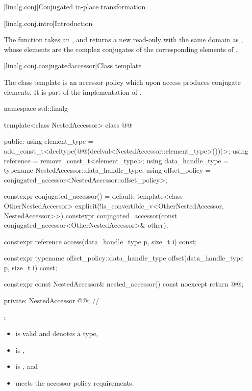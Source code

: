[linalg.conj]{Conjugated in-place transformation}

[linalg.conj.intro]{Introduction}

\pnum
The  function takes an  ,
and returns a new read-only  
with the same domain as ,
whose elements are the complex conjugates
of the corresponding elements of .

[linalg.conj.conjugatedaccessor]{Class template }

\pnum
The class template 
is an  accessor policy
which upon access produces conjugate elements.
It is part of the implementation of
.

\begin{codeblock}
namespace std::linalg {
  template<class NestedAccessor>
  class @@ {
  public:
    using element_type =
      add_const_t<decltype(@@(declval<NestedAccessor::element_type>()))>;
    using reference = remove_const_t<element_type>;
    using data_handle_type = typename NestedAccessor::data_handle_type;
    using offset_policy = conjugated_accessor<NestedAccessor::offset_policy>;

    constexpr conjugated_accessor() = default;
    template<class OtherNestedAccessor>
      explicit(!is_convertible_v<OtherNestedAccessor, NestedAccessor>>)
      constexpr conjugated_accessor(const conjugated_accessor<OtherNestedAccessor>& other);

    constexpr reference access(data_handle_type p, size_t i) const;

    constexpr typename offset_policy::data_handle_type
      offset(data_handle_type p, size_t i) const;

    constexpr const NestedAccessor& nested_accessor() const noexcept { return @@; }

  private:
    NestedAccessor @@{};                           // \expos
  };
}
\end{codeblock}

\pnum
\mandates
\begin{itemize}
\item
{} is valid and denotes a type,
\item
{} is ,
\item
{} is , and
\item
{} meets the accessor policy requirements.
\end{itemize}

